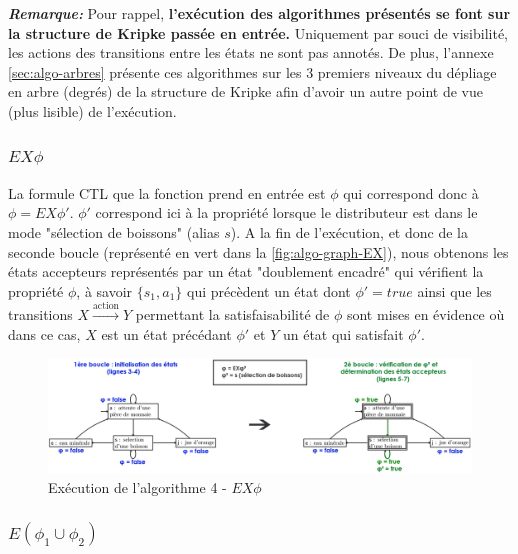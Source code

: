 \documentclass[runningheads,a4paper,10pt]{llncs}
\begin{document}
\danger
\textbf{\textit{Remarque:}} Pour rappel, \textbf{l'exécution des algorithmes présentés se font sur la structure de Kripke passée en entrée.} Uniquement par souci de visibilité, les actions des transitions entre les états ne sont pas annotés. De plus, l'annexe \autoref{sec:algo-arbres} présente ces algorithmes sur les 3 premiers niveaux du dépliage en arbre (degrés) de la structure de Kripke afin d'avoir un autre point de vue (plus lisible) de l'exécution. 

\subsubsection{$EX\phi$}

La formule CTL que la fonction prend en entrée est $\phi$ qui correspond donc à $\phi = EX\phi'$. $\phi '$ correspond ici à la propriété lorsque le distributeur est dans le mode "sélection de boissons" (alias $s$). A la fin de l'exécution, et donc de la seconde boucle (représenté en vert dans la \autoref{fig:algo-graph-EX}), nous obtenons les états accepteurs représentés par un état "doublement encadré" qui vérifient la propriété $\phi$, à savoir $\{s_{1} ,a_{1}\}$ qui précèdent un état dont $\phi ' = true$ ainsi que les transitions $X \xrightarrow{\text{action}} Y$ permettant la satisfaisabilité de $\phi$ sont mises en évidence où dans ce cas, $X$ est un état précédant $\phi '$ et $Y$ un état qui satisfait $\phi '$. 


\begin{figure}
  \centering
   \includegraphics[scale=0.37]{figures/algo-graph-EX.png}
   \caption[Caption for LOF]{Exécution de l'algorithme 4 - $EX\phi$}
   \label{fig:algo-graph-EX}
\end{figure} 

\subsubsection{$E(\phi_{1} \cup \phi_{2})$}
\end{document}

